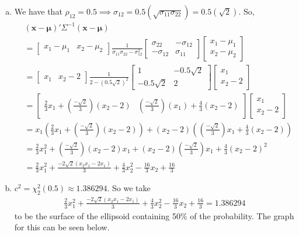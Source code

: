 \documentclass[12pt]{article}\usepackage[]{graphicx}\usepackage[]{color}
\newcommand{\vct}{\mathbf}
\begin{document}
\begin{enumerate}[a)]
\item We have that $\rho_{12} = 0.5 \implies \sigma_{12} = 0.5(\sqrt{\sigma_{11}\sigma_{22}}) = 0.5(\sqrt{2})$. So,
\begin{align*}
&(\vct{x} - \vct{\mu})'\Sigma^{-1}(\vct{x} - \vct{\mu})\\
&= \begin{bmatrix} x_1 - \mu_1 & x_2 - \mu_2 \end{bmatrix} \frac{1}{\sigma_{11}\sigma_{22}-\sigma_{12}^2} \begin{bmatrix} \sigma_{22} & -\sigma_{12} \\ -\sigma_{12} & \sigma_{11} \end{bmatrix} \begin{bmatrix} x_1 - \mu_1 \\ x_2 - \mu_2 \end{bmatrix}\\
&= \begin{bmatrix} x_1 & x_2 - 2 \end{bmatrix} \frac{1}{2-(0.5\sqrt{2})^2} \begin{bmatrix} 1 & -0.5\sqrt{2} \\ -0.5\sqrt{2} & 2 \end{bmatrix} \begin{bmatrix} x_1 \\ x_2 - 2 \end{bmatrix}\\
&= \begin{bmatrix} \frac{2}{3} x_1 + (\frac{-\sqrt{2}}{3})(x_2 - 2) & (\frac{-\sqrt{2}}{3})(x_1 ) + \frac{4}{3}(x_2 - 2) \end{bmatrix} \begin{bmatrix} x_1 \\ x_2 - 2 \end{bmatrix}\\
&= x_1\left(\frac{2}{3} x_1 + \left(\frac{-\sqrt{2}}{3}\right)(x_2 - 2)\right) + (x_2 - 2)\left(\left(\frac{-\sqrt{2}}{3}\right)x_1 + \frac{4}{3}(x_2 - 2)\right)\\
&= \frac{2}{3}x_1^2 + \left(\frac{-\sqrt{2}}{3}\right)(x_2 - 2)x_1 + (x_2 - 2)\left(\frac{-\sqrt{2}}{3}\right)x_1 + \frac{4}{3}(x_2 - 2)^2\\
&= \frac{2}{3}x_1^2 + \frac{-2\sqrt{2}(x_2x_1 - 2x_1)}{3} + \frac{4}{3}x_2^2 - \frac{16}{3}x_2 + \frac{16}{3}
\end{align*}

\item $c^2 = \chi^2_2(0.5) \approx 1.386294$. So we take 
\begin{align*}
\frac{2}{3}x_1^2 + \frac{-2\sqrt{2}(x_2x_1 - 2x_1)}{3} + \frac{4}{3}x_2^2 - \frac{16}{3}x_2 + \frac{16}{3} = 1.386294
\end{align*}
to be the surface of the ellipsoid containing 50\% of the probability. The graph for this can be seen below.


\end{enumerate}
\end{document}
